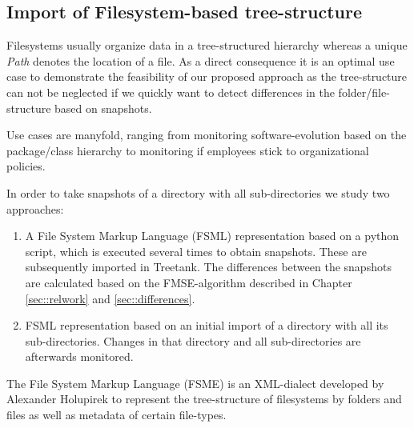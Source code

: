 

\subsection{Import of Filesystem-based tree-structure}
Filesystems usually organize data in a tree-structured hierarchy whereas a unique \emph{Path} denotes the location of a file. As a direct consequence it is an optimal use case to demonstrate the feasibility of our proposed approach as the tree-structure can not be neglected if we quickly want to detect differences in the folder/file-structure based on snapshots.

Use cases are manyfold, ranging from monitoring software-evolution based on the package/class hierarchy to monitoring if employees stick to organizational policies.

In order to take snapshots of a directory with all sub-directories we study two approaches:

\begin{enumerate}
\item A File System Markup Language (FSML\cite{FSML}) representation based on a python script\cite{FSML}, which is executed several times to obtain snapshots. These are subsequently imported in Treetank. The differences between the snapshots are calculated based on the FMSE-algorithm described in Chapter \ref{sec::relwork} and \ref{sec::differences}.
\item FSML representation based on an initial import of a directory with all its sub-directories. Changes in that directory and all sub-directories are afterwards monitored.
\end{enumerate}

The File System Markup Language (FSME) is an XML-dialect developed by Alexander Holupirek to represent the tree-structure of filesystems by folders and files as well as metadata of certain file-types. 

